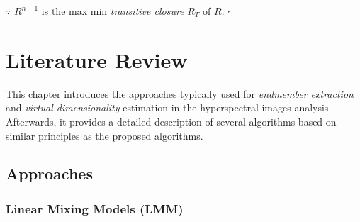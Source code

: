 \documentclass[11pt, oneside]{Thesis} %
\newcommand*\bombcontradicts{\texttt{[image: ./ParaTesisDeMaestria/bomb.png]} (contradiction)}
\begin{document}
$\because$ $R^{n-1}$ is the max min \emph{transitive closure} $R_T$ of $R$. \hspace{0.5cm}$\square$

\iffalse
Therefore, ($R_T = R^m$) for some $m>(n-1)$; say ($m=n$). Then, for some 
($x, y \in R_T$) with ($x \neq y$), there exists a path that does not 
repeat any vertex as it follows:
\[
 x R^1 x_2, x_2 R^2 x_3, ,..., x_{n-1} R^{n-1} x_{n}, x_{n} R^{n} y,
\]
then, 
\[
\#S > n \text{\hspace{0.5cm} \bombcontradicts}
\]
$\because$ $R^{n-1}$ is the max min transitive closure of $R$. \hspace{0.5cm}$\square$ \\
\fi
















\chapter{Literature Review} %

\label{ChapterLiteratureReview} %


This chapter introduces the approaches typically used for 
\emph{endmember extraction} and \emph{virtual dimensionality} 
estimation in the hyperspectral images analysis. Afterwards, it provides a 
detailed description of several algorithms based on similar principles as 
the proposed algorithms.


\section{Approaches}

\subsection{Linear Mixing Models (LMM)}
\end{document}
